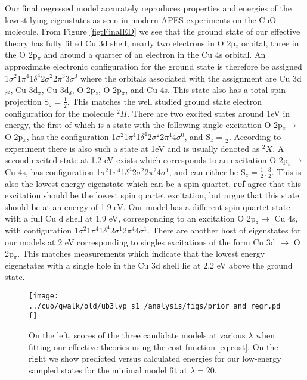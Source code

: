 \documentclass{article}
\begin{document}
Our final regressed model accurately reproduces properties and energies of the lowest lying eigenstates as seen in modern APES experiments on the CuO molecule.
From Figure \ref{fig:FinalED} we see that the ground state of our effective theory has fully filled Cu 3d shell, nearly two electrons in O 2p$_z$ orbital, three in the O 2p$_\pi$ and around a quarter of an electron in the Cu 4s orbital.
An approximate electronic configuration for the ground state is therefore
be assigned 1$\sigma^2$1$\pi^4$1$\delta^4$2$\sigma^2$2$\pi^3$3$\sigma^0$ where the orbitals associated with the assignment are Cu 3d$_{z^2}$, Cu 3d$_\pi$, Cu 3d$_\delta$, O 2p$_z$, O 2p$_\pi$, and Cu 4s.
This state also has a total spin projection S$_z = \frac{1}{2}$.
This matches the well studied ground state electron configuration for the molecule $^2\Pi$.
There are two excited states around 1eV in energy, the first of which is a state with the following single excitation O 2p$_z \rightarrow$ O 2p$_\pi$, has the configuration 1$\sigma^2$1$\pi^4$1$\delta^4$2$\sigma^2$2$\pi^4$4$\sigma^0$, and S$_z = \frac{1}{2}$.
According to experiment there is also such a state at 1eV and is usually denoted as $^2X$.
A second excited state at 1.2 eV exists which corresponds to an excitation 
O 2p$_\pi \rightarrow$ Cu 4s, has configuration 1$\sigma^2$1$\pi^4$1$\delta^4$2$\sigma^2$2$\pi^2$4$\sigma^1$, and can either be S$_z = \frac{1}{2}, \frac{3}{2}$. 
This is also the lowest energy eigenstate which can be a spin quartet.
\textbf{ref} agree that this excitation should be the lowest spin quartet excitation, but argue that this state should be at an energy of 1.9 eV. 
Our model has a different spin quartet state with a full Cu d shell at 1.9 eV, corresponding to an excitation O 2p$_z \rightarrow$ Cu 4s, with configuration 1$\sigma^2$1$\pi^4$1$\delta^4$2$\sigma^1$2$\pi^4$4$\sigma^1$. 
There are another host of eigenstates for our models at 2 eV corresponding to singles excitations of the form Cu 3d $\rightarrow$ O 2p$_\pi$. 
This matches measurements which indicate that the lowest energy eigenstates with a single hole in the Cu 3d shell lie at 2.2 eV above the ground state.


\begin{figure}[H]
\begin{center}
\texttt{[image: ../cuo/qwalk/old/ub3lyp\_s1\_/analysis/figs/prior\_and\_regr.pdf]}
\end{center}
\caption{On the left, scores of the three candidate models at various $\lambda$ when fitting our effective theories using the cost function \eqref{eq:cost}. On the right we show predicted versus calculated energies for our low-energy sampled states for the minimal model fit at $\lambda = 20$.}
\label{fig:Prior}
\end{figure}
\end{document}
